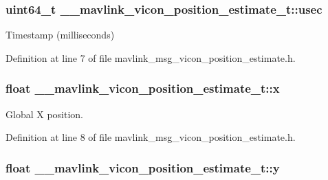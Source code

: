 \hypertarget{struct____mavlink__vicon__position__estimate__t_af85a18ad9ce207a0e62a0ea878a067fc}{
\subsubsection[{usec}]{\setlength{\rightskip}{0pt plus 5cm}uint64\-\_\-t \-\_\-\-\_\-mavlink\-\_\-vicon\-\_\-position\-\_\-estimate\-\_\-t\-::usec}}\label{struct____mavlink__vicon__position__estimate__t_af85a18ad9ce207a0e62a0ea878a067fc}


Timestamp (milliseconds) 



Definition at line 7 of file mavlink\-\_\-msg\-\_\-vicon\-\_\-position\-\_\-estimate.\-h.

\hypertarget{struct____mavlink__vicon__position__estimate__t_a7a1c3ca07a59f990638cc4611214f2ad}{
\subsubsection[{x}]{\setlength{\rightskip}{0pt plus 5cm}float \-\_\-\-\_\-mavlink\-\_\-vicon\-\_\-position\-\_\-estimate\-\_\-t\-::x}}\label{struct____mavlink__vicon__position__estimate__t_a7a1c3ca07a59f990638cc4611214f2ad}


Global X position. 



Definition at line 8 of file mavlink\-\_\-msg\-\_\-vicon\-\_\-position\-\_\-estimate.\-h.

\hypertarget{struct____mavlink__vicon__position__estimate__t_a78826f7765dd3b9d745d11d31a7bcf01}{
\subsubsection[{y}]{\setlength{\rightskip}{0pt plus 5cm}float \-\_\-\-\_\-mavlink\-\_\-vicon\-\_\-position\-\_\-estimate\-\_\-t\-::y}}\label{struct____mavlink__vicon__position__estimate__t_a78826f7765dd3b9d745d11d31a7bcf01}


